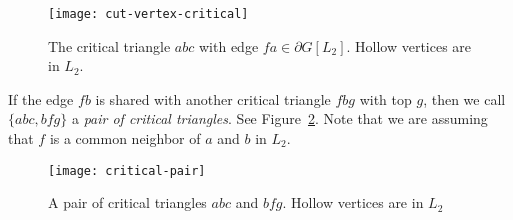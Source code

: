 \documentclass[11pt]{article}
\begin{document}
\begin{figure}[tbh]
  \centering
    \texttt{[image: cut-vertex-critical]}
      \caption{The critical triangle $abc$ with edge $fa \in \partial G[L_2]$. Hollow vertices are in $L_2$. }
       \label{fig:cut-vertex-critical}
\end{figure}

If the edge $fb$ is shared with another critical triangle $fbg$ with top $g$, then we call $\{abc,bfg\}$ a \emph{pair of critical triangles}. See Figure~\ref{fig:critical-pair}. Note that we are assuming that $f$ is a common neighbor of $a$ and $b$ in $L_2$.  

\begin{figure}[tbh]
  \centering
    \texttt{[image: critical-pair]}
      \caption{A pair of critical triangles $abc$ and $bfg$. Hollow vertices are in $L_2$}
       \label{fig:critical-pair}
\end{figure}
\end{document}
